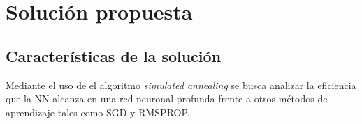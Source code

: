 


























\section{Solución propuesta}
\subsection{Características de la solución}
Mediante el uso de el algoritmo {\em simulated annealing} se busca analizar la eficiencia que la NN alcanza en una red neuronal profunda frente a otros métodos de aprendizaje tales como SGD y RMSPROP.

